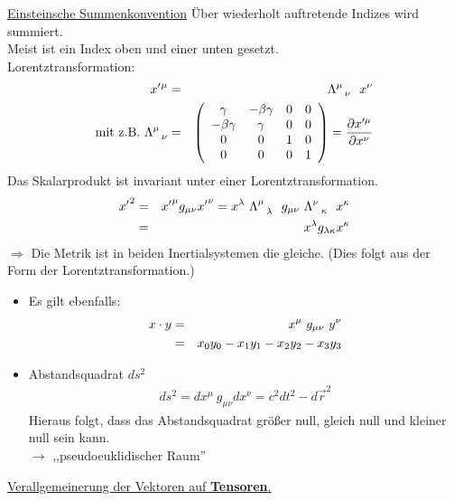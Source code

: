 \underline{Einsteinsche Summenkonvention}
Über wiederholt auftretende Indizes wird summiert.\\
Meist ist ein Index oben und einer unten gesetzt.\\
Lorentztransformation:
\begin{eqnarray*}
x'{}^{\mu} &=& \Lambda^{\mu}_{\ \ \nu} \ \ x^{\nu}\\
\text{mit z.B. } \Lambda_{\ \ \nu}^{\mu} &=& \left ( \begin{array}{cccc} \gamma&-\beta\gamma&0&0\\ -\beta \gamma&\gamma&0&0\\ 0&0&1&0\\0&0&0&1 \end{array} \right)=\frac{\partial x'^{\mu}}{\partial x^{\nu}}
\end{eqnarray*}
Das Skalarprodukt ist invariant unter einer Lorentztransformation.
\begin{eqnarray*}
{x'}^2 \g {x'} ^{\mu} g_{\mu\nu} {x'}^{\nu} = x^{\lambda}\ \Lambda _{\ \ \lambda}^{\mu}\  \ g_{\mu\nu} \  \Lambda_{\ \ \kappa}^{\nu}\ \ x^{\kappa} \\ \g x^{\lambda} g_{\lambda \kappa} x^{\kappa}
\end{eqnarray*}
$\Longrightarrow$ Die Metrik ist in beiden Inertialsystemen die gleiche. (Dies folgt aus der Form der Lorentztransformation.)
\begin{itemize}
\item Es gilt ebenfalls:
\begin{eqnarray*} x \cdot y &=& x^{\mu} \ g_{\mu\nu} \ y^{\nu} \\ &=& x_0y_0 - x_1y_1-x_2y_2-x_3y_3 \end{eqnarray*}
\item Abstandsquadrat  $ds^2$\\
\begin{eqnarray*} ds^2 = dx^{\mu} \ g_{\mu \nu} dx^{\nu} = c^2dt^2 - d\vec r^2\end{eqnarray*}
Hieraus folgt, dass das Abstandsquadrat größer null, gleich null und kleiner null sein kann.\\
$\longrightarrow$ ,,pseudoeuklidischer Raum''
\end{itemize}
\vspace{1.5cm}
\underline{Verallgemeinerung der Vektoren auf {\bf Tensoren}.}
